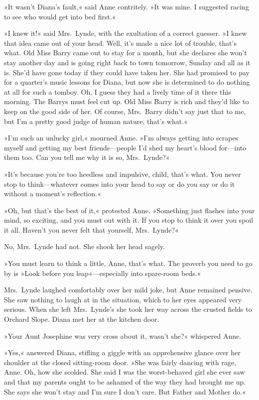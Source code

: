»It wasn't Diana's fault,« said Anne contritely. »It was mine. I suggested racing to see who would get into bed first.«

»I knew it!« said Mrs.~Lynde, with the exultation of a correct guesser. »I knew that idea came out of your head. Well, it's made a nice lot of trouble, that's what. Old Miss Barry came out to stay for a month, but she declares she won't stay another day and is going right back to town tomorrow, Sunday and all as it is. She'd have gone today if they could have taken her. She had promised to pay for a quarter's music lessons for Diana, but now she is determined to do nothing at all for such a tomboy. Oh, I guess they had a lively time of it there this morning. The Barrys must feel cut up. Old Miss Barry is rich and they'd like to keep on the good side of her. Of course, Mrs.~Barry didn't say just that to me, but I'm a pretty good judge of human nature, that's what.«

»I'm such an unlucky girl,« mourned Anne. »I'm always getting into scrapes myself and getting my best friends—people I'd shed my heart's blood for—into them too. Can you tell me why it is so, Mrs.~Lynde?«

»It's because you're too heedless and impulsive, child, that's what. You never stop to think—whatever comes into your head to say or do you say or do it without a moment's reflection.«

»Oh, but that's the best of it,« protested Anne. »Something just flashes into your mind, so exciting, and you must out with it. If you stop to think it over you spoil it all. Haven't you never felt that yourself, Mrs.~Lynde?«

No, Mrs.~Lynde had not. She shook her head sagely.

»You must learn to think a little, Anne, that's what. The proverb you need to go by is »Look before you leap«—especially into spare-room beds.«

Mrs.~Lynde laughed comfortably over her mild joke, but Anne remained pensive. She saw nothing to laugh at in the situation, which to her eyes appeared very serious. When she left Mrs.~Lynde's she took her way across the crusted fields to Orchard Slope. Diana met her at the kitchen door.

»Your Aunt Josephine was very cross about it, wasn't she?« whispered Anne.

»Yes,« answered Diana, stifling a giggle with an apprehensive glance over her shoulder at the closed sitting-room door. »She was fairly dancing with rage, Anne. Oh, how she scolded. She said I was the worst-behaved girl she ever saw and that my parents ought to be ashamed of the way they had brought me up. She says she won't stay and I'm sure I don't care. But Father and Mother do.«

